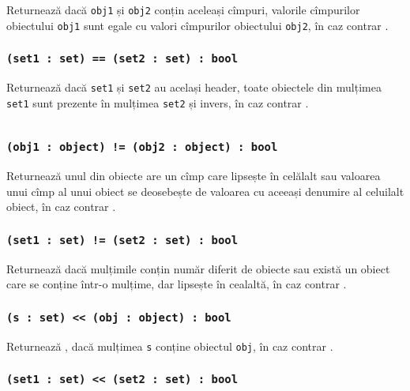 Returnează \true{} dacă \texttt{obj1} și \texttt{obj2} conțin aceleași cîmpuri, valorile cîmpurilor obiectului \texttt{obj1} sunt egale cu valori cîmpurilor obiectului \texttt{obj2}, în caz contrar \false{}.

\subsubsection{\texttt{(set1 : set) == (set2 : set) : bool}}

Returnează \true{} dacă \texttt{set1} și \texttt{set2} au același header, toate obiectele din mulțimea \texttt{set1} sunt prezente în mulțimea \texttt{set2} și invers, în caz contrar \false{}.

\begin{sourcecode}
    \label{setobjopex}
    \inputminted[linenos]{icl}{../sources/setobjopex.icL}
\end{sourcecode}

\subsubsection{\texttt{(obj1 : object) != (obj2 : object) : bool}}

Returnează \true{} unul din obiecte are un cîmp care lipsește în celălalt sau valoarea unui cîmp al unui obiect se deosebește de valoarea cu aceeași denumire al celuilalt obiect, în caz contrar \false{}.

\subsubsection{\texttt{(set1 : set) != (set2 : set) : bool}}

Returnează \true{} dacă mulțimile conțin număr diferit de obiecte sau există un obiect care se conține într-o mulțime, dar lipsește în cealaltă, în caz contrar \false{}.

\subsubsection{\texttt{(s : set) << (obj : object) : bool}}

Returnează \true{}, dacă mulțimea \texttt{s} conține obiectul \texttt{obj}, în caz contrar \false{}.

\subsubsection{\texttt{(set1 : set) << (set2 : set) : bool}}

